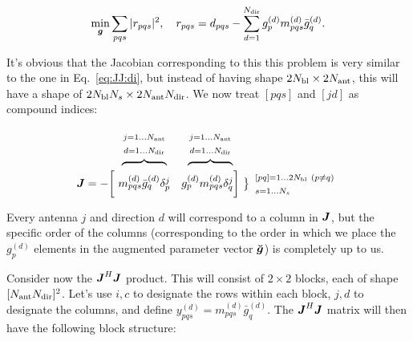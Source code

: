 \documentclass[useAMS,usenatbib]{mn2e}
\newcommand{\mat}[1]{{\bmath{#1}}}
\newcommand{\JJ}{\mat{J}} %
\newcommand{\MM}{\mat{M}}
\newcommand{\GG}{\mat{G}}
\newcommand{\JHJ}{\JJ^H\JJ} %
\begin{document}
\newcommand{\GGd}{\GG^{(d)}}
\newcommand{\GGdH}{\GG^{(d)H}}
\newcommand{\MMd}{\MM^{(d)}}
\newcommand{\YYd}{\YY^{(d)}}
\newcommand{\YYdH}{\YY^{(d)H}}
\newcommand{\YYc}{\YY^{(c)}}
\newcommand{\YYcH}{\YY^{(c)H}}
\newcommand{\ggd}{g^{(d)}}
\newcommand{\ggdH}{\bar{g}^{(d)}}
\newcommand{\ggc}{g^{(c)}}
\newcommand{\ggcH}{\bar{g}^{(c)}}
\newcommand{\mmc}{m^{(c)}}
\newcommand{\mmd}{m^{(d)}}
\newcommand{\mmcH}{\bar{m}^{(c)}}
\newcommand{\mmdH}{\bar{m}^{(d)}}
\newcommand{\yyd}{y^{(d)}}
\newcommand{\yydH}{\bar{y}^{(d)}}
\newcommand{\yyc}{y^{(c)}}
\newcommand{\yycH}{\bar{y}^{(c)}}

\begin{equation}
\label{eq:cal:dd:unpol}
\min_{\bmath{g}}\sum_{pqs}|r_{pqs}|^2, ~~~
r_{pqs} = d_{pqs} - \sum_{d=1}^{\Nd} \ggd_p \mmd_{pqs} \ggdH_q.
\end{equation}

It's obvious that the Jacobian corresponding to this  this problem is very similar to the one 
in Eq.~\ref{eq:JJ:di}, but instead of having shape $2N_\mathrm{bl}\times2N_\mathrm{ant}$, this will have a 
shape of $2N_\mathrm{bl}N_s\times 2N_\mathrm{ant}N_\mathrm{dir}$. We now treat $[pqs]$ and $[jd]$ as compound indices: 

\[
\begin{array}{r@{~}cc@{~}cc}
 & \overbrace{~~~~~~~~~~~~}^{\Stack{\scriptstyle j=1\dots \Na\\\scriptstyle d=1\dots \Nd}} & 
   \overbrace{~~~~~~~~~~~~}^{\Stack{\scriptstyle j=1\dots \Na\\\scriptstyle d=1\dots \Nd}} \\
\JJ = - \bigg [ &
  \mmd_{pqs}\ggdH_q \delta^j_p & 
  \ggd_p \mmd_{pqs}  \delta^j_q 
\bigg ] &
\big \}
\begin{array}{l}
\scriptstyle [pq]=1\dots 2\Nbl~(p\ne q)\\ \scriptstyle s=1\dots\Ns
\end{array}

\end{array}
\]

Every antenna $j$ and direction $d$ will correspond to a column in $\JJ$, but the specific order of the columns 
(corresponding to the order in which we place the $\ggd_p$ elements in the augmented parameter vector $\Gg$)
is completely up to us. 

Consider now the $\JHJ$ product. This will consist of $2\times2$ blocks, each of shape 
$[N_\mathrm{ant}N_\mathrm{dir}]^2$. Let's use $i,c$ to designate the rows within each block, $j,d$ to designate the columns, 
and define $\yyd_{pqs}=\mmd_{pqs}\ggdH_q$. The $\JHJ$ matrix will then have the following block 
structure:
\end{document}
